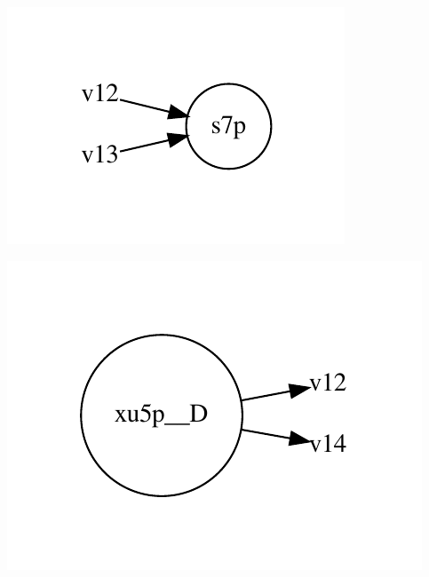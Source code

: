 \documentclass{scrartcl}
\begin{document}
\begin{minipage}{0.33\linewidth}
\includegraphics[max width=\linewidth]{metabolic_maps/s7p.pdf}
\end{minipage}
\begin{minipage}{0.33\linewidth}
\includegraphics[max width=\linewidth]{metabolic_maps/xu5p__D.pdf}
\end{minipage}
\end{document}
